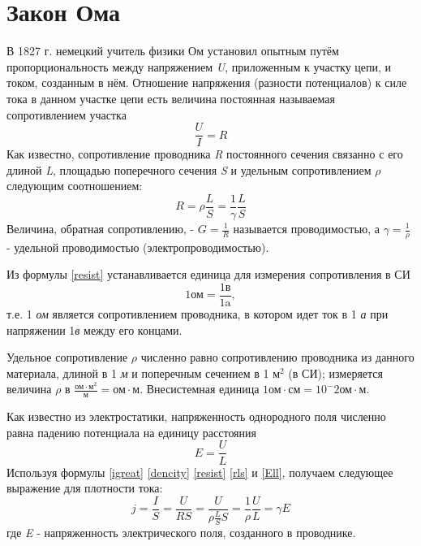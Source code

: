 \documentclass[a4paper,10pt]{book}
\begin{document}
\section{Закон Ома}
В 1827 г. немецкий учитель физики Ом установил опытным путём пропорциональность между напряжением \emph{U}, приложенным к участку цепи, и током, созданным в нём. Отношение напряжения (разности потенциалов) к силе тока в данном участке цепи есть величина
постоянная называемая сопротивлением участка
\begin{equation}\label{resist}
 \frac{U}{I} = R
\end{equation}
Как известно, сопротивление проводника \emph{R} постоянного сечения связанно с его длиной \emph{L}, площадью поперечного сечения \emph{S} и удельным сопротивлением $\rho$ следующим соотношением:
\begin{equation}\label{rls}
 R = \rho\frac{L}{S} = \frac{1}{\gamma}\frac{L}{S}
\end{equation}
Величина, обратная сопротивлению, - $G = \frac{1}{R}$ называется проводимостью, а $\gamma = \frac{1}{\rho}$ - удельной проводимостью
(электропроводимостью).

Из формулы \ref{resist} устанавливается единица для измерения сопротивления в СИ
\begin{equation}
 1 \text{ом} = \frac{1\text{в}}{1\text{a}},
\end{equation}
т.е. 1 \emph{ом} является сопротивлением проводника, в котором идет ток в 1 \emph{а} при напряжении 1\emph{в} между его концами.

Удельное сопротивление $\rho$ численно равно сопротивлению проводника из данного материала, длиной в 1 \emph{м} и поперечным сечением
в 1 $\text{м}^2$ (в СИ); измеряется величина $\rho$ в $\frac{\text{ом} \cdot \text{м}^2}{\text{м}} = \text{ом} \cdot \text{м}$.
Внесистемная единица $1 \text{ом} \cdot \text{см} = 10^-2 \text{ом} \cdot \text{м}$.

Как известно из электростатики, напряженность однородного поля численно равна падению потенциала на единицу расстояния
\begin{equation}\label{Ell}
 E = \frac{U}{L}
\end{equation}
Используя формулы \ref{igreat} \ref{dencity} \ref{resist} \ref{rls} и \ref{Ell}, получаем следующее выражение для плотности тока:
\begin{equation}\label{longf}
 j = \frac{I}{S} = \frac{U}{RS} = \frac{U}{\rho\frac{L}{S}S} = \frac{1}{\rho}\frac{U}{L} = \gamma E
\end{equation}
где \emph{E} - напряженность электрического поля, созданного в проводнике.
\end{document}
